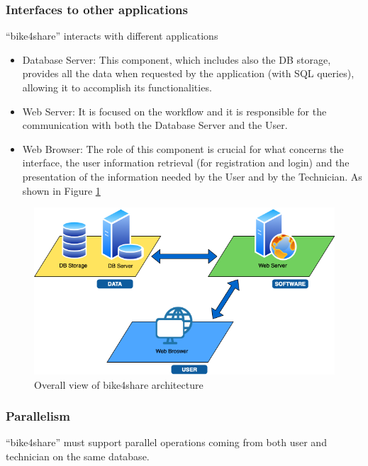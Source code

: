 \documentclass{article}
\begin{document}
\subsubsection{Interfaces to other applications}
“bike4share” interacts with different applications
\begin{itemize}
    \item Database Server: This component, which includes also the DB storage, provides all the data when requested by the application (with SQL queries), allowing it to accomplish its functionalities.
    \item Web Server: It is focused on the workflow and it is responsible for the communication with both the Database Server and the User.
    \item Web Browser: The role of this component is crucial for what concerns the interface, the user information retrieval (for registration and login) and the presentation of the information needed by the User and by the Technician. 
    As shown in Figure \ref{fig:arch}\\
\end{itemize}
\begin{figure}[H]
    \centering
    \includegraphics[width=0.85\linewidth]{image/hardware_COMPLETE.png}
    \caption{Overall view of bike4share architecture}
    \label{fig:arch}
\end{figure}

\subsubsection{Parallelism}
“bike4share” must support parallel operations coming from both user and technician on the same database.
\end{document}
